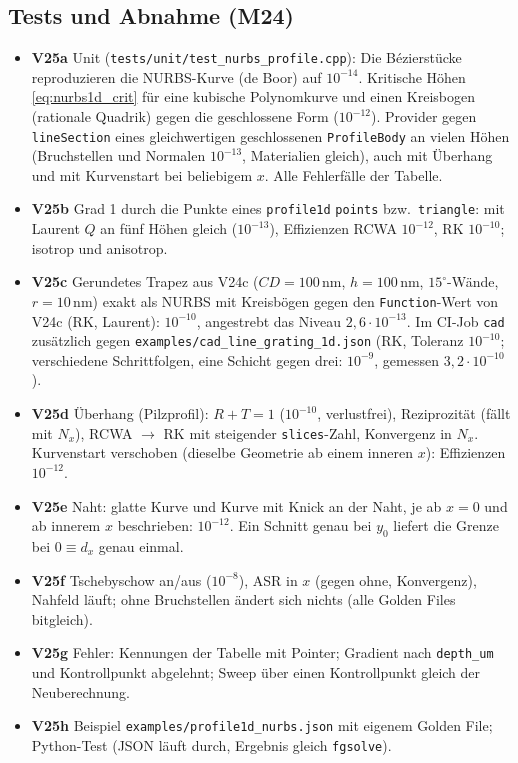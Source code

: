 \subsection{Tests und Abnahme (M24)}
\begin{itemize}[nosep]
  \item \textbf{V25a} Unit (\verb|tests/unit/test_nurbs_profile.cpp|): Die Bézierstücke reproduzieren die NURBS-Kurve
        (de Boor) auf $10^{-14}$. Kritische Höhen \eqref{eq:nurbs1d_crit} für eine kubische Polynomkurve und einen
        Kreisbogen (rationale Quadrik) gegen die geschlossene Form ($10^{-12}$). Provider gegen \verb|lineSection| eines
        gleichwertigen geschlossenen \verb|ProfileBody| an vielen Höhen (Bruchstellen und Normalen $10^{-13}$,
        Materialien gleich), auch mit Überhang und mit Kurvenstart bei beliebigem $x$. Alle Fehlerfälle der Tabelle.
  \item \textbf{V25b} Grad 1 durch die Punkte eines \verb|profile1d| \verb|points| bzw.\ \verb|triangle|: mit Laurent
        $Q$ an fünf Höhen gleich ($10^{-13}$), Effizienzen RCWA $10^{-12}$, RK $10^{-10}$; isotrop und anisotrop.
  \item \textbf{V25c} Gerundetes Trapez aus V24c ($CD=100$\,nm, $h=100$\,nm, $15^\circ$-Wände, $r=10$\,nm) exakt als
        NURBS mit Kreisbögen gegen den \verb|Function|-Wert von V24c (RK, Laurent): $10^{-10}$, angestrebt das Niveau
        $2{,}6\cdot10^{-13}$. Im CI-Job \verb|cad| zusätzlich gegen \verb|examples/cad_line_grating_1d.json| (RK, Toleranz $10^{-10}$;
        verschiedene Schrittfolgen, eine Schicht gegen drei: $10^{-9}$, gemessen $3{,}2\cdot10^{-10}$).
  \item \textbf{V25d} Überhang (Pilzprofil): $R+T=1$ ($10^{-10}$, verlustfrei), Reziprozität (fällt mit $N_x$),
        RCWA $\to$ RK mit steigender \verb|slices|-Zahl, Konvergenz in $N_x$. Kurvenstart verschoben (dieselbe
        Geometrie ab einem inneren $x$): Effizienzen $10^{-12}$.
  \item \textbf{V25e} Naht: glatte Kurve und Kurve mit Knick an der Naht, je ab $x=0$ und ab innerem $x$ beschrieben:
        $10^{-12}$. Ein Schnitt genau bei $y_0$ liefert die Grenze bei $0\equiv d_x$ genau einmal.
  \item \textbf{V25f} Tschebyschow an/aus ($10^{-8}$), ASR in $x$ (gegen ohne, Konvergenz), Nahfeld läuft; ohne
        Bruchstellen ändert sich nichts (alle Golden Files bitgleich).
  \item \textbf{V25g} Fehler: Kennungen der Tabelle mit Pointer; Gradient nach \verb|depth_um| und Kontrollpunkt
        abgelehnt; Sweep über einen Kontrollpunkt gleich der Neuberechnung.
  \item \textbf{V25h} Beispiel \verb|examples/profile1d_nurbs.json| mit eigenem Golden File; Python-Test (JSON läuft
        durch, Ergebnis gleich \verb|fgsolve|).
\end{itemize}

